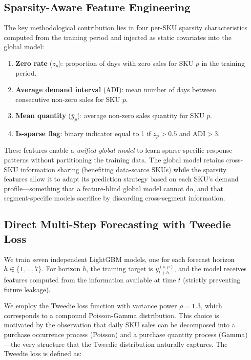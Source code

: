 \documentclass[review,authoryear]{elsarticle}
\begin{document}
\subsection{Sparsity-Aware Feature Engineering}

The key methodological contribution lies in four per-SKU sparsity characteristics computed from the training period and injected as static covariates into the global model:

\begin{enumerate}
    \item \textbf{Zero rate} ($z_p$): proportion of days with zero sales for SKU $p$ in the training period.
    \item \textbf{Average demand interval} (ADI): mean number of days between consecutive non-zero sales for SKU $p$.
    \item \textbf{Mean quantity} ($\bar{y}_p$): average non-zero sales quantity for SKU $p$.
    \item \textbf{Is-sparse flag}: binary indicator equal to 1 if $z_p > 0.5$ and $\text{ADI} > 3$.
\end{enumerate}

These features enable a \emph{unified global model} to learn sparse-specific response patterns without partitioning the training data. The global model retains cross-SKU information sharing (benefiting data-scarce SKUs) while the sparsity features allow it to adapt its prediction strategy based on each SKU's demand profile---something that a feature-blind global model cannot do, and that segment-specific models sacrifice by discarding cross-segment information.

\subsection{Direct Multi-Step Forecasting with Tweedie Loss}

We train seven independent LightGBM models, one for each forecast horizon $h \in \{1, \ldots, 7\}$. For horizon $h$, the training target is $y_{t+h}^{(s,p)}$, and the model receives features computed from the information available at time $t$ (strictly preventing future leakage).

We employ the Tweedie loss function with variance power $\rho = 1.3$, which corresponds to a compound Poisson-Gamma distribution. This choice is motivated by the observation that daily SKU sales can be decomposed into a purchase occurrence process (Poisson) and a purchase quantity process (Gamma)---the very structure that the Tweedie distribution naturally captures. The Tweedie loss is defined as:
\end{document}
